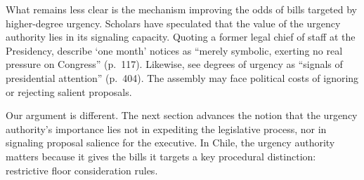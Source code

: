 \documentclass[letter,12pt]{article}
\begin{document}


What remains less clear is the mechanism improving the odds of bills targeted by higher-degree urgency. Scholars have speculated that the value of the urgency authority lies in its signaling capacity. Quoting a former legal chief of staff at the Presidency, \citeauthor{berrios.gamboa.fiscChile.2006} describe `one month' notices as ``merely symbolic, exerting no real pressure on Congress'' (p.~117). Likewise, \citeauthor{aleman.navia.UrgChi.2009} see degrees of urgency as ``signals of presidential attention'' (p.~404). The assembly may face political costs of ignoring or rejecting salient proposals. 

Our argument is different. The next section advances the notion that the urgency authority's importance lies not in expediting the legislative process, nor in signaling proposal salience for the executive. In Chile, the urgency authority matters because it gives the bills it targets a key procedural distinction: restrictive floor consideration rules.  
\end{document}
